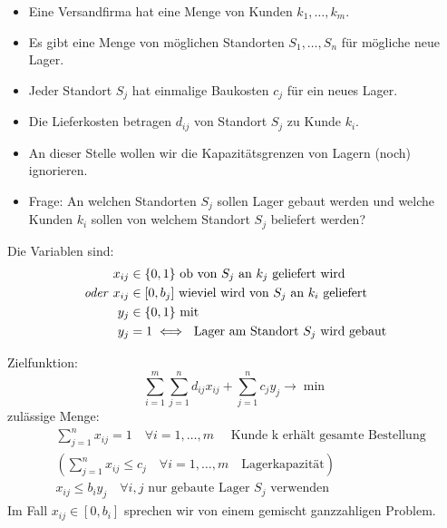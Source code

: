 \begin{beispiel}\enter
  \begin{itemize}[nosep]
    \item Eine Versandfirma hat eine Menge von Kunden $k_{1},\dots,k_{m}$.
	  \item Es gibt eine Menge von möglichen Standorten $S_{1},\dots, S_{n}$ für mögliche neue Lager.
    \item Jeder Standort $S_j$ hat einmalige Baukosten $c_{j}$ für ein neues Lager.
    \item Die Lieferkosten betragen $d_{ij}$ von Standort $S_{j}$ zu Kunde $k_{i}$.
    \item An dieser Stelle wollen wir die Kapazitätsgrenzen von Lagern (noch) ignorieren.
	  \item Frage: An welchen Standorten $S_{j}$ sollen Lager gebaut werden und welche Kunden $k_{i}$ sollen von welchem Standort $S_{j}$ beliefert werden?
  \end{itemize}
	Die Variablen sind:
	\begin{align*}
    x_{ij}&\in \{0,1\} \text{ ob von $S_j$ an $k_j$ geliefert wird}\\
    \text{\emph{oder} } x_{ij} & \in [0,b_j] \text{ wieviel wird von $S_{j}$ an $k_{i}$ geliefert}\\
		y_{j} &\in \{0,1\}\text{ mit }  \\
		y_{j}& = 1 \iff \text{ Lager am Standort $S_{j}$ wird gebaut}
	\end{align*}

	Zielfunktion:
	\begin{equation*}
		\sum_{i=1}^{m} \sum_{j=1}^{n}  d_{ij}x_{ij} + \sum_{j=1}^{n} c_{j}y_{j} \rightarrow \min
	\end{equation*}
	zulässige Menge:
	\begin{align*}
		&\sum_{j=1}^{n} x_{ij} =1 \quad \forall i=1,\dots, m\quad \text{ Kunde k erhält gesamte Bestellung}\\
		&\left(\sum_{j=1}^{n} x_{ij} \leq c_{j} \quad \forall i=1,\dots, m \quad \text{Lagerkapazität}\right)\\
		&x_{ij} \leq b_{i}y_{j} \quad \forall i,j \text{ nur gebaute Lager $S_{j}$ verwenden}
	\end{align*}
	Im Fall $x_{ij} \in [0,b_{i}]$ sprechen wir von einem gemischt ganzzahligen Problem.
\end{beispiel}

